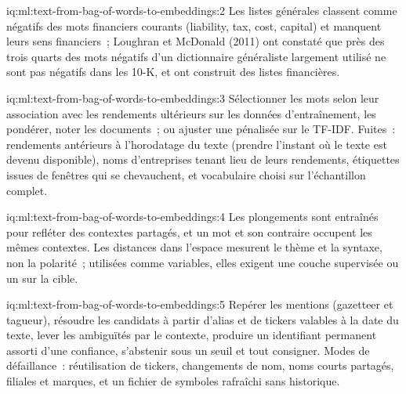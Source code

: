 \begin{solution}{iq:ml:text-from-bag-of-words-to-embeddings:2}
Les listes générales classent comme négatifs des mots financiers courants (liability, tax, cost, capital) et manquent leurs sens financiers~; Loughran
et McDonald (2011) ont constaté que près des trois quarts des mots négatifs d'un dictionnaire généraliste largement utilisé ne sont pas
négatifs dans les 10-K, et ont construit des listes financières.
\end{solution}

\begin{solution}{iq:ml:text-from-bag-of-words-to-embeddings:3}
Sélectionner les mots selon leur association avec les rendements ultérieurs sur les données d'entraînement, les pondérer, noter les documents~; ou ajuster une
 pénalisée sur le TF-IDF. Fuites~: rendements antérieurs à l'horodatage du texte (prendre l'instant où le texte est devenu
disponible), noms d'entreprises tenant lieu de leurs rendements, étiquettes issues de fenêtres qui se chevauchent, et vocabulaire
choisi sur l'échantillon complet.
\end{solution}

\begin{solution}{iq:ml:text-from-bag-of-words-to-embeddings:4}
Les plongements sont entraînés pour refléter des contextes partagés, et un mot et son contraire occupent les mêmes contextes. Les distances dans
l'espace mesurent le thème et la syntaxe, non la polarité~; utilisées comme variables, elles exigent une couche supervisée ou un  sur la cible.
\end{solution}

\begin{solution}{iq:ml:text-from-bag-of-words-to-embeddings:5}
Repérer les mentions (gazetteer et tagueur), résoudre les candidats à partir d'alias et de tickers valables à la date du texte, lever les ambiguïtés
par le contexte, produire un identifiant permanent assorti d'une confiance, s'abstenir sous un seuil et tout consigner. Modes de défaillance~:
réutilisation de tickers, changements de nom, noms courts partagés, filiales et marques, et un fichier de symboles rafraîchi sans historique.
\end{solution}


